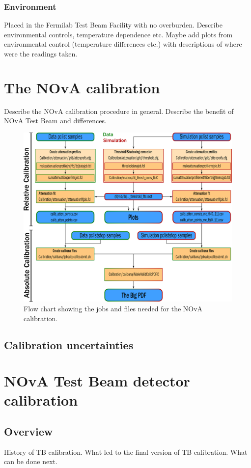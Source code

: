 \documentclass[12pt,a4paper]{article}
\begin{document}
\subsubsection*{Environment}
Placed in the Fermilab Test Beam Facility with no overburden. Describe environmental controls, temperature dependence etc. Maybe add plots from environmental control (temperature differences etc.) with descriptions of where were the readings taken.


\section{The NOvA calibration}
Describe the NOvA calibration procedure in general. Describe the benefit of NOvA Test Beam and differences.

\begin{figure}[hbtp]
\centering
\includegraphics[width=\textwidth]{Plots/CalibrationFlowChart.png}
\caption{Flow chart showing the jobs and files needed for the NOvA calibration.}
\end{figure}

\subsection{Calibration uncertainties}

\section{NOvA Test Beam detector calibration}
\subsection{Overview}
History of TB calibration. What led to the final version of TB calibration. What can be done next.
\end{document}
